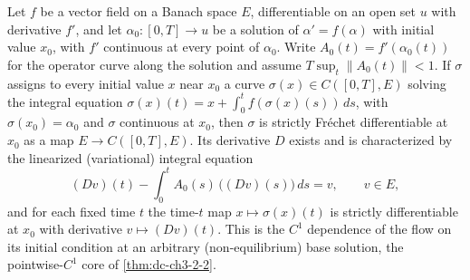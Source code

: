 \begin{lemma}
  \label{lem:dc-ch3-2-2-c1dep}
  \leanok
  Let $f$ be a vector field on a Banach space $E$, differentiable on an open
  set $u$ with derivative $f'$, and let $\alpha_0 : [0,T] \to u$ be a solution
  of $\alpha' = f(\alpha)$ with initial value $x_0$, with $f'$ continuous at
  every point of $\alpha_0$. Write $A_0(t) = f'(\alpha_0(t))$ for the operator
  curve along the solution and assume $T \sup_t \|A_0(t)\| < 1$. If $\sigma$
  assigns to every initial value $x$ near $x_0$ a curve
  $\sigma(x) \in C([0,T], E)$ solving the integral equation
  $\sigma(x)(t) = x + \int_0^t f(\sigma(x)(s))\,ds$, with
  $\sigma(x_0) = \alpha_0$ and $\sigma$ continuous at $x_0$, then $\sigma$ is
  strictly Fr\'echet differentiable at $x_0$ as a map $E \to C([0,T], E)$. Its
  derivative $D$ exists and is characterized by the linearized (variational)
  integral equation
  $$
  (Dv)(t) - \int_0^t A_0(s)\,\big((Dv)(s)\big)\,ds = v, \qquad v \in E,
  $$
  and for each fixed time $t$ the time-$t$ map $x \mapsto \sigma(x)(t)$ is
  strictly differentiable at $x_0$ with derivative $v \mapsto (Dv)(t)$. This is
  the $C^1$ dependence of the flow on its initial condition at an arbitrary
  (non-equilibrium) base solution, the pointwise-$C^1$ core of
  \cref{thm:dc-ch3-2-2}.
\end{lemma}
